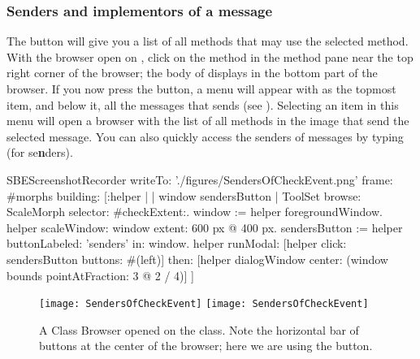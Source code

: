 \documentclass[a4paper,10pt,twoside]{book}
\begin{document}

\subsubsection{Senders and implementors of a message}
\label{sec:sendersImplementors}

The  button will give you a list of all methods that may use the selected method.
With the browser open on , click on the  method in the method pane near the top right corner of the browser; the body of  displays in the bottom part of the browser.
If you now press the  button, a menu will appear with  as the topmost item, and below it, all the messages that  sends (see ).
Selecting an item in this menu will open a browser with the list of all methods in the image that send the selected message.
You can also quickly access the senders of messages by typing  (for {se\textbf{n}ders}).

\begin{ExecuteSmalltalkScript}
SBEScreenshotRecorder writeTo: './figures/SendersOfCheckEvent.png' frame: #morphs building: [:helper |
	| window sendersButton |
	ToolSet browse: ScaleMorph selector: #checkExtent:.
	window := helper foregroundWindow.
	helper scaleWindow: window extent: 600 px @ 400 px.
	sendersButton := helper buttonLabeled: 'senders' in: window.
	helper
		runModal: [helper click: sendersButton buttons: #(left)]
		then: [helper dialogWindow center: (window bounds pointAtFraction: 3 @ 2 / 4)]
]
\end{ExecuteSmalltalkScript}
\begin{figure}[htbp]
	\begin{center}
   \ifluluelse
		{\texttt{[image: SendersOfCheckEvent]}}
		{\texttt{[image: SendersOfCheckEvent]}}
	\end{center}
	\caption{A Class Browser opened on the  class. Note the horizontal bar of buttons at the center of the browser; here we are using the  button.}
	\label{fig:SendersOfCheckEvent}
\end{figure}
\end{document}
